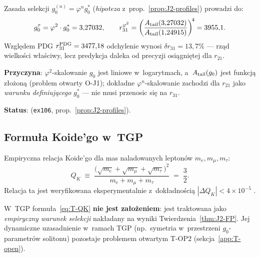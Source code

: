 \begin{proposition}%
\label{prop:T-phi2-fail}
Zasada selekcji $g_0^{(n)} = \varphi^n g_0^*$ (\emph{hipoteza}
z~prop.~\ref{prop:J2-profiles}) prowadzi do:
\begin{equation}\label{eq:T-phi2}
  g_0^\tau = \varphi^2 \cdot g_0^* = 3{,}27032,
  \qquad
  r_{31}^{\varphi^2}
    = \left(\frac{A_{\rm tail}(3{,}27032)}{A_{\rm tail}(1{,}24915)}\right)^{\!4}
    = 3955{,}1.
\end{equation}
Wzgl\k{e}dem PDG $r_{31}^{\rm PDG} = 3477{,}18$ odchylenie wynosi
$\delta r_{31} = 13{,}7\%$ — rz\k{a}d wielko\'sci w\l{}a\'sciwy,
lecz predykcja daleka od precyzji osi\k{a}gni\k{e}tej dla $r_{21}$.

\textbf{Przyczyna}: $\varphi^2$-skalowanie $g_0$ jest liniowe
w~logarytmach, a~$A_{\rm tail}(g_0)$ jest funkcj\k{a} z\l{}o\.zon\k{a}
(problem otwarty O-J1); dok\l{}adne $\varphi^n$-skalowanie
zachodzi dla $r_{21}$ jako \emph{warunku definiuj\k{a}cego}
$g_0^*$ --- nie musi przenosic si\k{e} na $r_{31}$.

\textbf{Status}:  (\texttt{ex106},
prop.~\ref{prop:J2-profiles}).
\end{proposition}

\subsection{Formu\l{}a Koide'go w~TGP}%
\label{app:T-koide-def}

\begin{definition}\label{def:T-QK}
Empiryczna relacja Koide'go \cite{Koide:1983qe} dla mas naladowanych
lepton\'ow $m_e, m_\mu, m_\tau$:
\begin{equation}\label{eq:T-QK}
  \boxed{Q_K \;\equiv\;
    \frac{\bigl(\sqrt{m_e} + \sqrt{m_\mu} + \sqrt{m_\tau}\bigr)^2}%
         {m_e + m_\mu + m_\tau}
    \;=\; \frac{3}{2}.}
\end{equation}
Relacja ta jest weryfikowana eksperymentalnie z~dok\l{}adno\'sci\k{a}
$|\Delta Q_K| < 4 \times 10^{-5}$ \cite{PDG2024}.
\end{definition}

\begin{remark}\label{rem:T-koide-status}
W~TGP formu\l{}a~\eqref{eq:T-QK} \textbf{nie jest za\l{}o\.zeniem}:
jest traktowana jako \emph{empiryczny warunek selekcji}
nak\l{}adany na wyniki Twierdzenia~\ref{thm:J2-FP}.
Jej dynamiczne uzasadnienie w~ramach TGP
(np.\ symetria w~przestrzeni $g_0$-parametr\'ow solitonu)
pozostaje problemem otwartym T-OP2
(sekcja~\ref{app:T-open}).
\end{remark}

